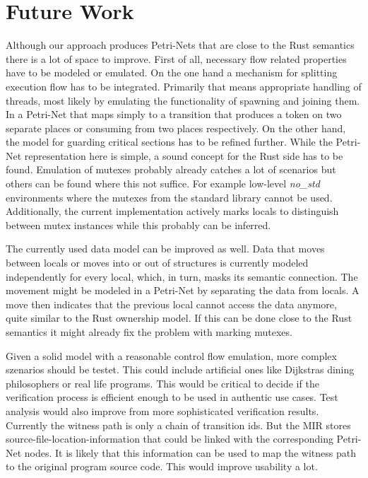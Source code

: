 \chapter{Future Work}
\label{future}
Although our approach produces Petri-Nets that are close to the Rust semantics there is a lot of space to improve.
First of all, necessary flow related properties have to be modeled or emulated.
On the one hand a mechanism for splitting execution flow has to be integrated.
Primarily that means appropriate handling of threads, most likely by emulating the functionality of spawning and joining them.
In a Petri-Net that maps simply to a transition that produces a token on two separate places or consuming from two places respectively.
On the other hand, the model for guarding critical sections has to be refined further.
While the Petri-Net representation here is simple, a sound concept for the Rust side has to be found.
Emulation of mutexes probably already catches a lot of scenarios but others can be found where this not suffice.
For example low-level \textit{no\_std} environments where the mutexes from the standard library cannot be used.
Additionally, the current implementation actively marks locals to distinguish between mutex instances while this probably can be inferred.

The currently used data model can be improved as well.
Data that moves between locals or moves into or out of structures is currently modeled independently for every local, which, in turn, masks its semantic connection.
The movement might be modeled in a Petri-Net by separating the data from locals.
A move then indicates that the previous local cannot access the data anymore, quite similar to the Rust ownership model.
If this can be done close to the Rust semantics it might already fix the problem with marking mutexes.

Given a solid model with a reasonable control flow emulation, more complex szenarios should be testet.
This could include artificial ones like Dijkstras dining philosophers \cite{dijkstra1971hierarchical} or real life programs.
This would be critical to decide if the verification process is efficient enough to be used in authentic use cases.
Test analysis would also improve from more sophisticated verification results.
Currently the witness path is only a chain of transition ids.
But the MIR stores source-file-location-information that could be linked with the corresponding Petri-Net nodes.
It is likely that this information can be used to map the witness path to the original program source code.
This would improve usability a lot.


